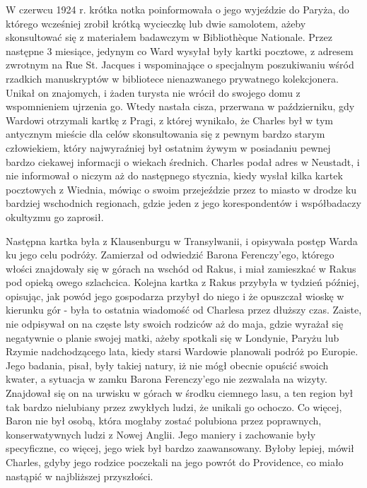 W czerwcu 1924 r. krótka notka poinformowała o jego wyjeździe do Paryża, do którego wcześniej zrobił krótką wycieczkę lub dwie samolotem, ażeby skonsultować się z materiałem badawczym w Bibliothèque Nationale. Przez następne 3 miesiące, jedynym co Ward wysyłał były kartki pocztowe, z adresem zwrotnym na Rue St. Jacques i wspominające o specjalnym poszukiwaniu wśród rzadkich manuskryptów w bibliotece nienazwanego prywatnego kolekcjonera. Unikał on znajomych, i żaden turysta nie wrócił do swojego domu z wspomnieniem ujrzenia go. Wtedy nastała cisza, przerwana w październiku, gdy Wardowi otrzymali kartkę z Pragi, z której wynikało, że Charles był w tym antycznym mieście dla celów skonsultowania się z pewnym bardzo starym człowiekiem, który najwyraźniej był ostatnim żywym w posiadaniu pewnej bardzo ciekawej informacji o wiekach średnich. Charles podał adres w Neustadt, i nie informował o niczym aż do następnego stycznia, kiedy wysłał kilka kartek pocztowych z Wiednia, mówiąc o swoim przejeździe przez to miasto w drodze ku bardziej wschodnich regionach, gdzie jeden z jego korespondentów i współbadaczy okultyzmu go zaprosił.  

Następna kartka była z Klausenburgu w Transylwanii, i opisywała postęp Warda ku jego celu podróży. Zamierzał od odwiedzić Barona Ferenczy'ego, którego włości znajdowały się w górach na wschód od Rakus, i miał zamieszkać w Rakus pod opieką owego szlachcica. Kolejna kartka z Rakus przybyła w tydzień później, opisując, jak powód jego gospodarza przybył do niego i że opuszczał wioskę w kierunku gór - była to ostatnia wiadomość od Charlesa przez dłuższy czas. Zaiste, nie odpisywał on na częste lsty swoich rodziców aż do maja, gdzie wyrażał się negatywnie o planie swojej matki, ażeby spotkali się w Londynie, Paryżu lub Rzymie nadchodzącego lata, kiedy starsi Wardowie planowali podróż po Europie. Jego badania, pisał, były takiej natury, iż nie mógł obecnie opuścić swoich kwater, a sytuacja w zamku Barona Ferenczy'ego nie zezwalała na wizyty. Znajdował się on na urwisku w górach w środku ciemnego lasu, a ten region był tak bardzo nielubiany przez zwykłych ludzi, że unikali go ochoczo. Co więcej, Baron nie był osobą, która mogłaby zostać polubiona przez poprawnych, konserwatywnych ludzi z Nowej Anglii. Jego maniery i zachowanie były specyficzne, co więcej, jego wiek był bardzo zaawansowany. Byłoby lepiej, mówił Charles, gdyby jego rodzice poczekali na jego powrót do Providence, co miało nastąpić w najbliższej przyszłości. 

